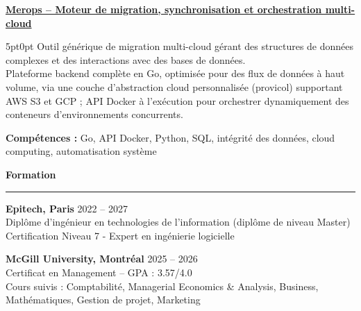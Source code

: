 \documentclass[9pt]{extarticle}
\begin{document}
\par\vspace{8pt}

\underline{\bfseries Merops -- Moteur de migration, synchronisation et orchestration multi-cloud}
\par
\begin{adjustwidth}{5pt}{0pt}
    Outil générique de migration multi-cloud gérant des structures de données complexes et des interactions avec des bases de données. \\
    Plateforme backend complète en Go, optimisée pour des flux de données à haut volume, via une couche d'abstraction cloud personnalisée ({\ttfamily provicol}) supportant AWS S3 et GCP ; API Docker à l'exécution pour orchestrer dynamiquement des conteneurs d'environnements concurrents.
\end{adjustwidth}
\par
{\bfseries Compétences :} Go, API Docker, Python, SQL, intégrité des données, cloud computing, automatisation système

\par\vspace{8pt}

{\large\bfseries Formation}
\par\vspace{-8pt}
\rule{\linewidth}{0.4pt}
\par\vspace{5pt}

{\bfseries Epitech, Paris} \hfill 2022 -- 2027 \\
Diplôme d'ingénieur en technologies de l'information (diplôme de niveau Master) \\
Certification Niveau 7 - Expert en ingénierie logicielle

\vspace{6pt}

{\bfseries McGill University, Montréal} \hfill 2025 -- 2026 \\
Certificat en Management -- GPA : 3.57/4.0 \\
Cours suivis : Comptabilité, Managerial Economics \& Analysis, Business, Mathématiques, Gestion de projet, Marketing
\end{document}
